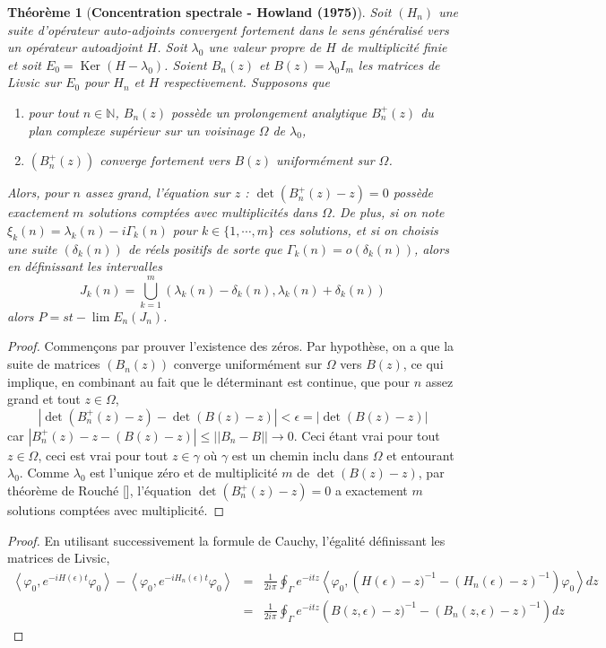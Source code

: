 \documentclass[12pt,openany,a4paper, titlepage]{article}
\newcommand{\f}[2]{\frac{#1}{#2}}
\newcommand{\lp}{\left(}
\newcommand{\rp}{\right)}
\newcommand{\la}{\left\langle}
\newcommand{\ra}{\right\rangle}
\newcommand{\N}{\mathbb{N}}
\newcommand{\Ker}{\operatorname{Ker}}
\newtheorem{theo}{Théorème}
\theoremstyle{definition}
\theoremstyle{definition}
\theoremstyle{definition}
\theoremstyle{definition}
\theoremstyle{definition}
\begin{document}
\begin{theo}[\textbf{Concentration spectrale - Howland (1975)}]
Soit $(H_n)$ une suite d'opérateur auto-adjoints convergent fortement dans le sens généralisé vers un opérateur autoadjoint $H$. Soit $\lambda_0$ une valeur propre de $H$ de multiplicité finie et soit $E_0 = \Ker(H -\lambda_0)$. Soient $B_n(z)$  et $B(z) = \lambda_0 I_m$ les matrices de Livsic sur $E_0$ pour $H_n$ et $H$ respectivement. 
Supposons que \begin{enumerate}
    \item[(1)] pour tout $n\in\N$, $B_n(z)$ possède un prolongement analytique $B_n^+(z)$ du plan complexe supérieur sur un voisinage $ \Omega$ de $\lambda_0$,
    \item[(2)] $\lp B_n^+(z)\rp$ converge fortement vers $B(z)$ uniformément sur $\Omega$.
\end{enumerate}
Alors, pour $n$ assez grand, l'équation sur $z$ : $\det(B_n^+(z) -z) = 0 $ possède exactement $m$ solutions comptées avec multiplicités dans $\Omega$. De plus, si on note $\xi_k(n) = \lambda_k(n) - i \Gamma_k(n)$ pour $k\in\{1,\cdots,m\}$ ces solutions, et si on choisis une suite $(\delta_k(n))$ de réels positifs de sorte que $\Gamma_k(n) = o(\delta_k(n))$, alors en définissant les intervalles 
$$ J_k(n) = \bigcup_{k=1}^m (\lambda_k(n) - \delta_k(n),\lambda_k(n) + \delta_k(n))$$ alors $P = st-\lim E_n(J_n)$.
\end{theo}

\begin{proof}
Commençons par prouver l'existence des zéros. Par hypothèse, on a que la suite de matrices $(B_n(z))$ converge uniformément sur $\Omega$ vers $B(z)$, ce qui implique, en combinant au fait que le déterminant est continue, que pour $n$ assez grand et tout $z\in\Omega$, $$ |\det (B_n^+(z) - z) - \det (B(z) - z)| < \epsilon = |\det (B(z) - z)| $$ car $|B_n^+(z) - z - (B(z) - z)| \leq ||B_n - B|| \rightarrow 0$. Ceci étant vrai pour tout $z\in\Omega$, ceci est vrai pour tout $z\in\gamma$ où $\gamma$ est un chemin inclu dans $\Omega$ et entourant $\lambda_0$. Comme $\lambda_0$ est l'unique zéro et de multiplicité $m$ de $\det (B(z) - z)$, par théorème de Rouché [], l'équation $\det(B_n^+(z) -z) = 0$ a exactement $m$ solutions comptées avec multiplicité.

\end{proof}

\newpage

\begin{proof}
En utilisant successivement la formule de Cauchy, l'égalité définissant les matrices de Livsic, 
\begin{eqnarray*}
\la \varphi_0,e^{-iH(\epsilon)t}\varphi_0 \ra - \la\varphi_0,e^{-iH_n(\epsilon)t}\varphi_0 \ra &=& \f{1}{2i\pi}\oint_\Gamma e^{-itz}\la \varphi_0,\lp H(\epsilon) -z)^{-1} - (H_n(\epsilon)-z)^{-1} \rp \varphi_0 \ra dz\\
&=& \f{1}{2i\pi}\oint_\Gamma e^{-itz} \lp B(z,\epsilon) -z)^{-1} - (B_n(z,\epsilon)-z)^{-1} \rp dz
\end{eqnarray*}
\end{proof}
\end{document}
